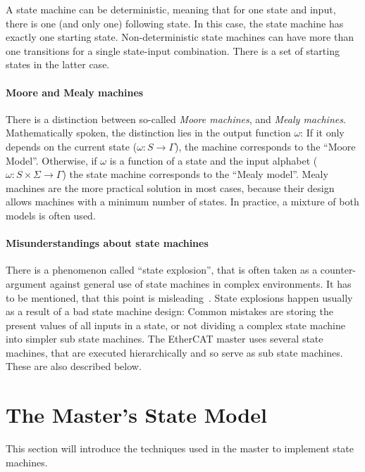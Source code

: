 \documentclass[a4paper,12pt,BCOR6mm,bibtotoc,idxtotoc]{scrbook}
\begin{document}
A state machine can be deterministic, meaning that for one state and
input, there is one (and only one) following state. In this case, the
state machine has exactly one starting state. Non-deterministic state
machines can have more than one transitions for a single state-input
combination. There is a set of starting states in the latter case.

\paragraph{Moore and Mealy machines}

There is a distinction between so-called \textit{Moore machines}, and
\textit{Mealy machines}. Mathematically spoken, the distinction lies
in the output function $\omega$: If it only depends on the current
state ($\omega: S \rightarrow \Gamma$), the machine corresponds to the
``Moore Model''. Otherwise, if $\omega$ is a function of a state and
the input alphabet ($\omega: S \times \Sigma \rightarrow \Gamma$) the
state machine corresponds to the ``Mealy model''. Mealy machines are
the more practical solution in most cases, because their design allows
machines with a minimum number of states. In practice, a mixture of
both models is often used.

\paragraph{Misunderstandings about state machines}

There is a phenomenon called ``state explosion'', that is often taken as a
counter-argument against general use of state machines in complex environments.
It has to be mentioned, that this point is misleading~\cite{fsmmis}. State
explosions happen usually as a result of a bad state machine design: Common
mistakes are storing the present values of all inputs in a state, or not
dividing a complex state machine into simpler sub state machines. The EtherCAT
master uses several state machines, that are executed hierarchically and so
serve as sub state machines. These are also described below.


\section{The Master's State Model}
\label{sec:statemodel}

This section will introduce the techniques used in the master to
implement state machines.
\end{document}
